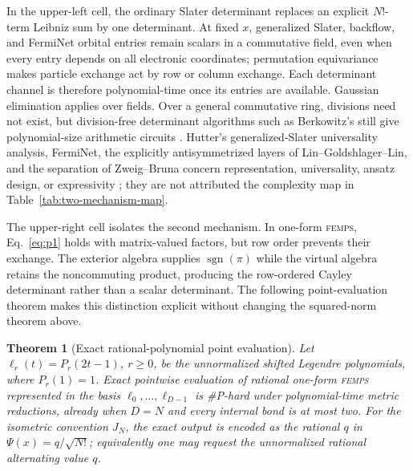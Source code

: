 \documentclass[11pt]{article}
\newtheorem{theorem}{Theorem}[section]
\theoremstyle{definition}
\newcommand{\FEMPS}{\textnormal{\textsc{femps}}}
\begin{document}
In the upper-left cell, the ordinary Slater determinant replaces an explicit
$N!$-term Leibniz sum by one determinant.  At fixed $x$, generalized Slater,
backflow, and FermiNet orbital entries remain scalars in a commutative field,
even when every entry depends on all electronic coordinates; permutation
equivariance makes particle exchange act by row or column exchange.  Each
determinant channel is therefore polynomial-time once its entries are
available.  Gaussian elimination applies over fields.  Over a general
commutative ring, divisions need not exist, but division-free determinant
algorithms such as Berkowitz's still give polynomial-size arithmetic circuits
\cite{Berkowitz1984Determinant}.  Hutter's generalized-Slater universality
analysis, FermiNet, the explicitly antisymmetrized layers of
Lin--Goldshlager--Lin, and the separation of Zweig--Bruna concern
representation, universality, ansatz design, or expressivity
\cite{Hutter2020Antisymmetric,Pfau2020FermiNet,
LinGoldshlagerLin2023Antisymmetrized,ZweigBruna2022Separation}; they are not
attributed the complexity map in Table~\ref{tab:two-mechanism-map}.

The upper-right cell isolates the second mechanism.  In one-form \FEMPS{},
Eq.~\eqref{eq:p1} holds with matrix-valued factors, but row order prevents their
exchange.  The exterior algebra supplies $\operatorname{sgn}(\pi)$ while the
virtual algebra retains the noncommuting product, producing the row-ordered
Cayley determinant rather than a scalar determinant.  The following
point-evaluation theorem makes this distinction explicit without changing the
squared-norm theorem above.

\begin{theorem}[Exact rational-polynomial point evaluation]
\label{thm:pointwise}
Let $\ell_r(t)=P_r(2t-1)$, $r\ge0$, be the unnormalized shifted Legendre
polynomials, where $P_r(1)=1$.  Exact pointwise evaluation of rational
one-form \FEMPS{} represented in the basis
$\ell_0,\ldots,\ell_{D-1}$ is \#P-hard under polynomial-time metric
reductions, already when $D=N$ and every internal bond is at most two.
For the isometric convention $J_N$, the exact output is encoded as the
rational $q$ in $\Psi(x)=q/\sqrt{N!}$; equivalently one may request the
unnormalized rational alternating value $q$.
\end{theorem}
\end{document}
